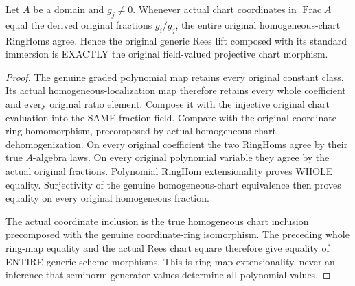 \begin{lemma}
\label{scheme:actual-rees-generic-projective-comparison}
Let $A$ be a domain and $g_j\ne0$. Whenever actual chart coordinates in
$\operatorname{Frac}A$ equal the derived original fractions $g_i/g_j$, the
entire original homogeneous-chart RingHoms agree. Hence the original generic
Rees lift composed with its standard immersion is EXACTLY the original
field-valued projective chart morphism.
\leanok
\end{lemma}
\begin{proof}
The genuine graded polynomial map retains every original constant class.
Its actual homogeneous-localization map therefore retains every whole
coefficient and every original ratio element. Compose it with the injective
original chart evaluation into the SAME fraction field. Compare with the
original coordinate-ring homomorphism, precomposed by actual homogeneous-chart
dehomogenization. On every original coefficient the two RingHoms agree by their
true $A$-algebra laws. On every original polynomial variable they agree by
the actual original fractions. Polynomial RingHom extensionality proves
WHOLE equality. Surjectivity of the genuine homogeneous-chart equivalence
then proves equality on every original homogeneous fraction.

The actual coordinate inclusion is the true homogeneous chart inclusion
precomposed with the genuine coordinate-ring isomorphism. The preceding whole
ring-map equality and the actual Rees chart square therefore give equality of
ENTIRE generic scheme morphisms. This is ring-map extensionality, never an
inference that seminorm generator values determine all polynomial values.
\end{proof}

